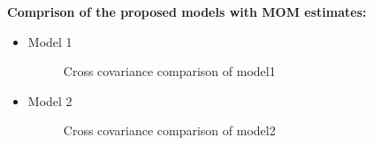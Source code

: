 \newpage
{\bf Comprison of the proposed models with MOM estimates:}

\begin{itemize}
\item Model 1\\

\begin{figure}[H]
\begin{center}
\caption{Cross covariance comparison of model1}
\end{center}
\end{figure}

\newpage
\item Model 2
\begin{figure}[H]
\begin{center}
\caption{Cross covariance comparison of model2}
\end{center}
\end{figure}



\end{itemize}
